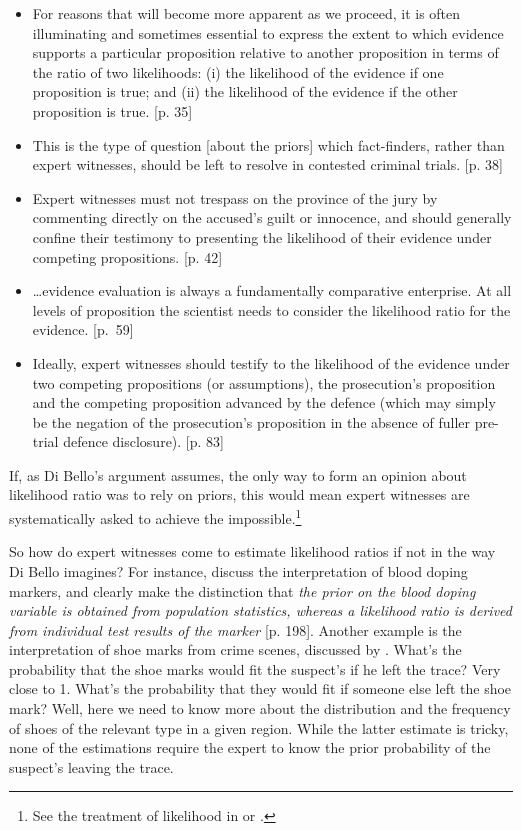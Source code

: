 \documentclass{article}
\begin{document}
\footnotesize
\begin{itemize}
\item For reasons that will become more apparent as we proceed, it is often illuminating and sometimes essential to express the extent to which evidence supports a particular proposition relative to another proposition in terms of the ratio of two likelihoods: (i) the likelihood of the evidence if one proposition is true; and (ii) the likelihood of the evidence if the other proposition is true. [p. 35] 
\item This is the type of question [about the priors] which fact-finders, rather than expert witnesses, should be left to resolve in contested criminal trials. [p. 38] 
\item Expert witnesses must not trespass on the province of the jury by commenting directly on the accused’s guilt or innocence, and should generally confine their testimony to presenting the likelihood of their evidence under competing propositions. [p. 42]
\item \dots  evidence evaluation is always a fundamentally comparative enterprise. At all levels of proposition the scientist needs to consider the likelihood ratio for the evidence. [p.~59] 
\item  Ideally, expert witnesses should testify to the likelihood of the evidence under two competing propositions (or assumptions), the prosecution’s proposition and the competing proposition advanced by the defence (which may simply be the negation of the prosecution’s proposition in the absence of fuller pre-trial defence disclosure). [p. 83]
\end{itemize}

\normalsize



 If, as Di Bello's argument assumes, the only way to form an opinion about likelihood ratio was to rely on priors, this would mean expert witnesses are systematically asked to achieve the impossible.\footnote{See  the treatment of likelihood in \citep{aitken2010fundamentals} or \citep{finkelstein2009basic}.} 

So how do expert witnesses come to estimate likelihood ratios if not in the way Di Bello imagines? For instance, \citet{sottas2008forensic} discuss the interpretation of blood doping markers, and clearly make the distinction that \emph{the prior on the blood doping variable is obtained from population statistics, whereas a likelihood ratio is derived from individual test results of the marker} [p. 198]. Another example is the interpretation of shoe marks from crime scenes, discussed by \citet{lucy2013introduction}. What's the probability that the shoe marks would fit the suspect's if he left the trace? Very close to 1. What's the probability that they would fit if someone else left the shoe mark? Well, here we need to know more about the distribution and the frequency of shoes of the relevant type in a given region. While the latter estimate is tricky, none of the estimations require the expert to know the prior probability of the suspect's leaving the trace.
\end{document}
